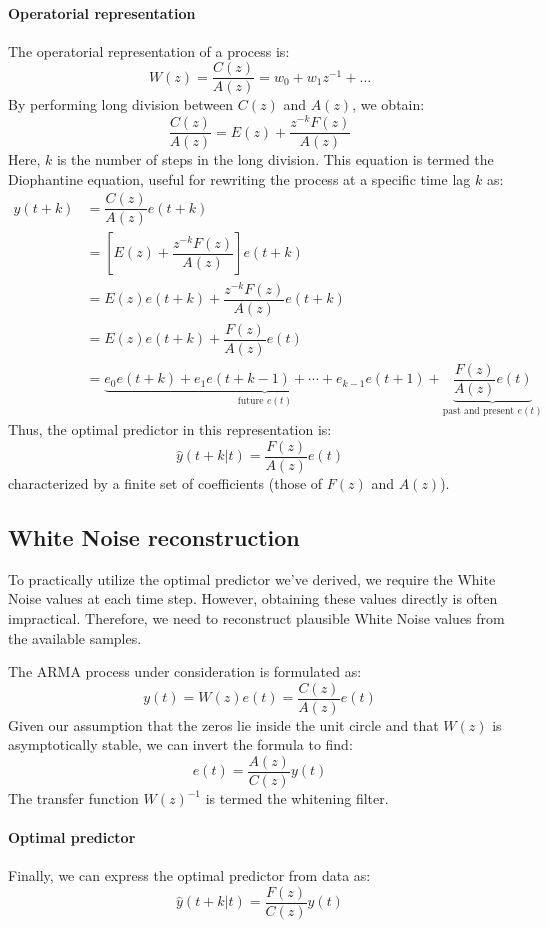 \paragraph*{Operatorial representation}
The operatorial representation of a process is:
\[W(z)=\dfrac{C(z)}{A(z)}=w_0+w_1z^{-1}+\dots\]
By performing long division between $C(z)$ and $A(z)$, we obtain:
\[\dfrac{C(z)}{A(z)}=E(z)+\dfrac{z^{-k}F(z)}{A(z)}\]
Here, $k$ is the number of steps in the long division.
This equation is termed the Diophantine equation, useful for rewriting the process at a specific time lag $k$ as:
\begin{align*}
    y(t+k)  &=\dfrac{C(z)}{A(z)}e(t+k) \\
            &=\left[E(z)+\dfrac{z^{-k}F(z)}{A(z)}\right]e(t+k) \\
            &=E(z)e(t+k)+\dfrac{z^{-k}F(z)}{A(z)}e(t+k) \\
            &=E(z)e(t+k)+\dfrac{F(z)}{A(z)}e(t) \\
            &=\underbrace{e_0e(t+k)+e_1e(t+k-1)+\cdots+e_{k-1}e(t+1)}_{\text{future } e(t)} +\underbrace{\dfrac{F(z)}{A(z)}e(t)}_{\text{past and present } e(t)} 
\end{align*}
Thus, the optimal predictor in this representation is:
\[\hat{y}(t+k|t)=\dfrac{F(z)}{A(z)}e(t)\]
characterized by a finite set of coefficients (those of $F(z)$ and $A(z)$).

\subsection{White Noise reconstruction}
To practically utilize the optimal predictor we've derived, we require the White Noise values at each time step. However, obtaining these values directly is often impractical. 
Therefore, we need to reconstruct plausible White Noise values from the available samples.

The ARMA process under consideration is formulated as:
\[y(t)=W(z)e(t)=\dfrac{C(z)}{A(z)}e(t)\]
Given our assumption that the zeros lie inside the unit circle and that $W(z)$ is asymptotically stable, we can invert the formula to find:
\[e(t)=\dfrac{A(z)}{C(z)}y(t)\]
The transfer function ${W(z)}^{-1}$ is termed the whitening filter.

\paragraph*{Optimal predictor}
Finally, we can express the optimal predictor from data as:
\[\hat{y}(t+k|t)=\dfrac{F(z)}{C(z)}y(t)\]

